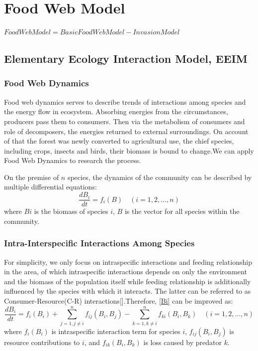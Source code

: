 \documentclass[12pt]{article}
\begin{document}
	\section{Food Web Model}
	$Food Web Model = Basic Food Web Model - Invasion Model$
	\subsection{Elementary Ecology Interaction Model, EEIM}
	\subsubsection{Food Web Dynamics}
	\hspace{2em}Food web dynamics serves to describe trends of interactions among species and the energy flow in ecosystem. Absorbing energies from the circumstances, producers pass them to consumers. Then via the metabolism of consumers and role of decomposers, the energies returned to external surroundings. On account of that the forest was newly converted to agricultural use, the chief species, including crops, insects and birds, their biomass is bound to change.We can apply Food Web Dynamics to research the process.
	
	On the premise of $n$ species, the dynamics of the community can be described by multiple differential equations:
	\begin{equation}
		\frac{dB_i}{dt}=f_i(B)\hspace{1em}(i=1,2,...,n)
		\label{Bi}
	\end{equation}
	where $Bi$ is the biomass of species $i$, $B$ is the vector for all species within the community.\\
	
	\subsubsection{Intra-Interspecific Interactions Among Species}
	\hspace{2em}For simplicity, we only focus on intraspecific interactions and feeding relationship in the area, of which intraspecific interactions depends on only the environment and the biomass of the population itself while feeding relationship is additionally influenced by the species with which it interacts. The latter can be referred to as Consumer-Resource(C-R) interactions[].Therefore, \ref{Bi} can be improved as:
	\begin{equation}
		\frac{dB_i}{dt}=f_i(B_i)+\sum_{j=1,j\neq i}^n f_{ij}(B_i,B_j)-\sum_{k=1,k\neq i}^n f_{ki}(B_i,B_k)\hspace{1em}(i=1,2,...,n)
	\end{equation}
	where $f_i(B_i)$ is intraspecific interaction term for species $i$, $f_{ij}(B_i,B_j)$ is resource contributions to $i$, and $f_{ik}(B_i,B_k)$ is loss caused by predator $k$.
	
\end{document}
